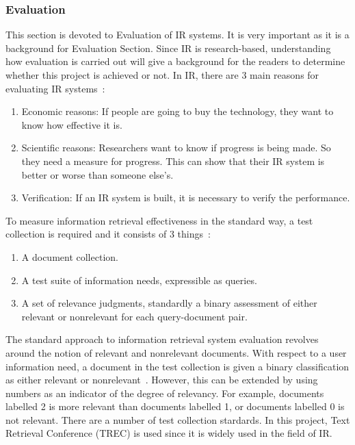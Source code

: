 \subsubsection{Evaluation}
This section is devoted to Evaluation of IR systems. It is very important as it is a background for Evaluation Section. 
Since IR is research-based, understanding how evaluation is carried out will give a background for the readers to determine whether 
this project is achieved or not. In IR, there are 3 main reasons for evaluating IR systems~\cite[P. 3]{eval}: 
\begin{enumerate}
 \item Economic reasons: If people are going to buy the technology, they want to know how effective it is.
 \item Scientific reasons: Researchers want to know if progress is being made. So they need a measure for progress. 
	This can show that their IR system is better or worse than someone else's.
 \item Verification: If an IR system is built, it is necessary to verify the performance.
\end{enumerate}

To measure information retrieval effectiveness in the standard way, a test collection is required and it consists of 3 things~\cite{evalweb}:
\begin{enumerate}
 \item A document collection.
 \item A test suite of information needs, expressible as queries.
 \item A set of relevance judgments, standardly a binary assessment of either relevant or nonrelevant for each query-document pair.
\end{enumerate}

The standard approach to information retrieval system evaluation revolves around the notion of relevant and nonrelevant documents. With respect 
to a user information need, a document in the test collection is given a binary classification as either relevant or nonrelevant~\cite{evalweb}. However,
this can be extended by using numbers as an indicator of the degree of relevancy. For example, documents labelled 2 is more relevant than documents
labelled 1, or documents labelled 0 is not relevant. There are a number of test collection stardards. In this project, Text Retrieval Conference (TREC)
is used since it is widely used in the field of IR.


